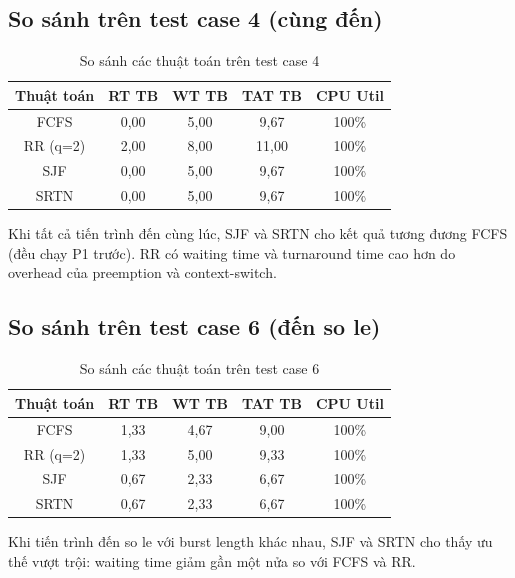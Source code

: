 \subsection{So sánh trên test case 4 (cùng đến)}

\begin{table}[h]
\centering
\begin{tabular}{|c|c|c|c|c|}
\hline
Thuật toán & RT TB & WT TB & TAT TB & CPU Util \\
\hline
FCFS & 0,00 & 5,00 & 9,67 & 100\% \\
RR (q=2) & 2,00 & 8,00 & 11,00 & 100\% \\
SJF & 0,00 & 5,00 & 9,67 & 100\% \\
SRTN & 0,00 & 5,00 & 9,67 & 100\% \\
\hline
\end{tabular}
\caption{So sánh các thuật toán trên test case 4}
\end{table}

Khi tất cả tiến trình đến cùng lúc, SJF và SRTN cho kết quả tương đương FCFS (đều chạy P1 trước). RR có waiting time và turnaround time cao hơn do overhead của preemption và context-switch.

\subsection{So sánh trên test case 6 (đến so le)}

\begin{table}[h]
\centering
\begin{tabular}{|c|c|c|c|c|}
\hline
Thuật toán & RT TB & WT TB & TAT TB & CPU Util \\
\hline
FCFS & 1,33 & 4,67 & 9,00 & 100\% \\
RR (q=2) & 1,33 & 5,00 & 9,33 & 100\% \\
SJF & 0,67 & 2,33 & 6,67 & 100\% \\
SRTN & 0,67 & 2,33 & 6,67 & 100\% \\
\hline
\end{tabular}
\caption{So sánh các thuật toán trên test case 6}
\end{table}

Khi tiến trình đến so le với burst length khác nhau, SJF và SRTN cho thấy ưu thế vượt trội: waiting time giảm gần một nửa so với FCFS và RR.

